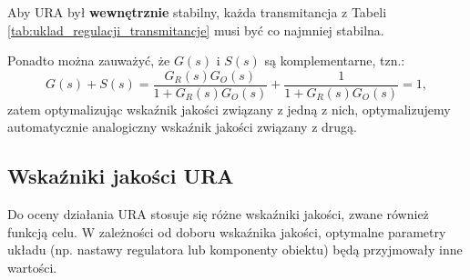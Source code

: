 \documentclass{article}
\begin{document}
    Aby URA był \textbf{wewnętrznie} stabilny, każda transmitancja z Tabeli \ref{tab:uklad_regulacji_transmitancje} musi być co najmniej stabilna.

    Ponadto można zauważyć, że $G(s)$ i $S(s)$ są komplementarne, tzn.:
    $$
        G(s) + S(s) = \frac{G_{R}(s)G_{O}(s)}{1 + G_{R}(s)G_{O}(s)} + \frac{1}{1 + G_{R}(s)G_{O}(s)} = 1,
    $$
    zatem optymalizując wskaźnik jakości związany z jedną z nich, optymalizujemy automatycznie analogiczny wskaźnik jakości związany z drugą.
    \subsection{Wskaźniki jakości URA}
    Do oceny działania URA stosuje się różne wskaźniki jakości, zwane również funkcją celu.
    W zależności od doboru wskaźnika jakości, optymalne parametry układu (np. nastawy regulatora lub komponenty obiektu) będą przyjmowały inne wartości.

\end{document}
